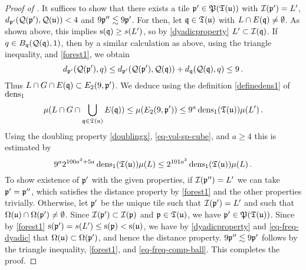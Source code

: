 \begin{proof}[Proof of ]
    It suffices to show that there exists a tile ${\mathfrak p}' \in {\mathfrak P}({\mathfrak T}({\mathfrak u}))$ with ${\mathcal{I}}({\mathfrak p}') = L'$, $d_{{\mathfrak p}'}({\mathcal{Q}}({\mathfrak p}'), {\mathcal{Q}}({\mathfrak u})) < 4$ and $9{\mathfrak p}'' \lesssim 9{\mathfrak p}'$.
    For then, let ${\mathfrak q} \in {\mathfrak T}({\mathfrak u})$ with $L \cap E({\mathfrak q}) \ne \emptyset$. As shown above, this implies ${\mathrm{s}}({\mathfrak q}) \ge s(L')$, so by \eqref{dyadicproperty} $L' \subset {\mathcal{I}}({\mathfrak q})$.
    If $q \in B_{{\mathfrak q}}({\mathcal{Q}}({\mathfrak q}), 1)$, then by a similar calculation as above, using the triangle inequality,  and \eqref{forest1}, we obtain
    $$
        d_{{\mathfrak p}'}({\mathcal{Q}}({\mathfrak p}'), q) \le d_{{\mathfrak p}'}({\mathcal{Q}}({\mathfrak p}'), {\mathcal{Q}}({\mathfrak q})) + d_{{\mathfrak q}}({\mathcal{Q}}({\mathfrak q}), q) \le 9\,.
    $$
    Thus $L \cap G \cap E({\mathfrak q}) \subset E_2(9, {\mathfrak p}')$. We deduce using the definition \eqref{definedens1} of $\operatorname{\operatorname{dens}}_1$
    $$
        \mu(L \cap G \cap \bigcup_{{\mathfrak q} \in {\mathfrak T}({\mathfrak u})} E({\mathfrak q})) \le \mu(E_2(9, {\mathfrak p}')) \le 9^a \operatorname{\operatorname{dens}}_1({\mathfrak T}({\mathfrak u})) \mu(L')\,.
    $$
    Using the doubling property \eqref{doublingx}, \eqref{eq-vol-sp-cube}, and $a \ge 4$ this is estimated by
    $$
        9^a 2^{100a^3 + 5a}\operatorname{\operatorname{dens}}_1({\mathfrak T}({\mathfrak u})) \mu(L) \le 2^{101 a^3} \operatorname{\operatorname{dens}}_1({\mathfrak T}({\mathfrak u}))\mu(L)\,.
    $$
    To show existence of ${\mathfrak p}'$ with the given properties, if ${\mathcal{I}}({\mathfrak p}'') = L'$ we can take ${\mathfrak p}' = {\mathfrak p}''$, which satisfies the distance property by \eqref{forest1} and the other properties trivially.
    Otherwise, let ${\mathfrak p}'$ be the unique tile such that ${\mathcal{I}}({\mathfrak p}') = L'$ and such that $\Omega({\mathfrak u}) \cap \Omega({\mathfrak p}') \ne \emptyset$.
    Since ${\mathcal{I}}({\mathfrak p}') \subset {\mathcal{I}}({\mathfrak p})$ and ${\mathfrak p} \in {\mathfrak T}({\mathfrak u})$, we have ${\mathfrak p}' \in {\mathfrak P}({\mathfrak T}({\mathfrak u}))$.
    Since by \eqref{forest1} ${\mathrm{s}}({\mathfrak p}') = s(L') \le {\mathrm{s}}({\mathfrak p}) < {\mathrm{s}}({\mathfrak u})$, we have by \eqref{dyadicproperty} and \eqref{eq-freq-dyadic} that $\Omega({\mathfrak u}) \subset \Omega({\mathfrak p}')$, and hence the distance property.
    $9{\mathfrak p}'' \lesssim 9{\mathfrak p}'$ follows by the triangle inequality, \eqref{forest1},  and \eqref{eq-freq-comp-ball}.
    This completes the proof.
\end{proof}

